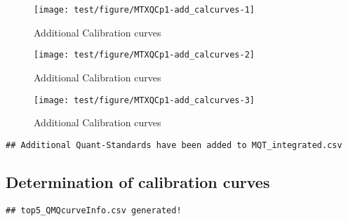 \documentclass[9pt,]{article}
\begin{document}
\begin{figure}

{\centering \texttt{[image: test/figure/MTXQCp1-add\_calcurves-1]} 

}

\caption{Additional Calibration curves}\label{fig:add_calcurves1}
\end{figure}\begin{figure}

{\centering \texttt{[image: test/figure/MTXQCp1-add\_calcurves-2]} 

}

\caption{Additional Calibration curves}\label{fig:add_calcurves2}
\end{figure}\begin{figure}

{\centering \texttt{[image: test/figure/MTXQCp1-add\_calcurves-3]} 

}

\caption{Additional Calibration curves}\label{fig:add_calcurves3}
\end{figure}

\begin{verbatim}
## Additional Quant-Standards have been added to MQT_integrated.csv
\end{verbatim}

\subsection{Determination of calibration
curves}\label{determination-of-calibration-curves}

\begin{verbatim}
## top5_QMQcurveInfo.csv generated!
\end{verbatim}
\end{document}
